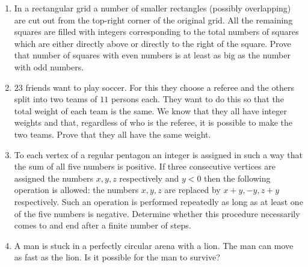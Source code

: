 \documentclass{article}
\begin{document}
\begin{enumerate}
		\item %
		In a rectangular grid a number of smaller rectangles (possibly overlapping) are cut out from the top-right corner of the original grid. All the remaining squares are filled with integers corresponding to the total numbers of squares which are either directly above or directly to the right of the square. Prove that number of squares with even numbers is at least as big as the number with odd numbers. 
		
		\item %
		$23$ friends want to play soccer. For this they choose a referee and the others split into two teams of $11$ persons each. They want to do this so that the total weight of each team is the same. We know that they all have integer weights and that, regardless of who is the referee, it is possible to make the two teams. Prove that they all have the same weight.
		
		\item  %
		To each vertex of a regular pentagon an integer is assigned in such a way that
		the sum of all five numbers is positive. If three consecutive vertices are assigned
		the numbers $x, y, z$ respectively and $y < 0$ then the following operation is
		allowed: the numbers $x, y, z$ are replaced by $x+y, -y, z+y$ respectively. Such
		an operation is performed repeatedly as long as at least one of the five numbers
		is negative. Determine whether this procedure necessarily comes to and end
		after a finite number of steps.
		
		\item %
		A man is stuck in a perfectly circular arena with a lion. The man can move as fast as the lion. Is it possible for the man to survive?
	\end{enumerate}
\end{document}
